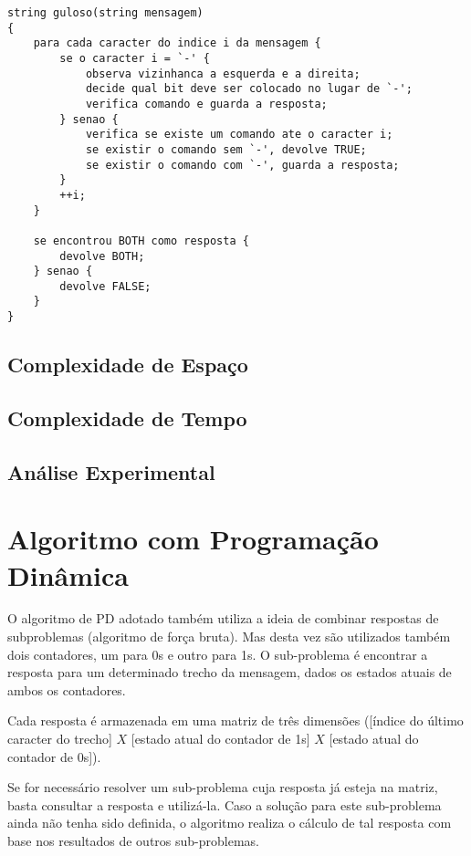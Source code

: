 \documentclass[a4paper,12pt,titlepage]{article}
\begin{document}
\begin{lstlisting}[caption=Algoritmo Guloso]
string guloso(string mensagem)
{
    para cada caracter do indice i da mensagem {
        se o caracter i = `-' {
            observa vizinhanca a esquerda e a direita;
            decide qual bit deve ser colocado no lugar de `-';
            verifica comando e guarda a resposta;
        } senao {
            verifica se existe um comando ate o caracter i;
            se existir o comando sem `-', devolve TRUE;
            se existir o comando com `-', guarda a resposta;
        }
        ++i;
    }
    
    se encontrou BOTH como resposta {
        devolve BOTH;
    } senao {
        devolve FALSE;
    }
}
\end{lstlisting}

\subsection{Complexidade de Espaço}
\subsection{Complexidade de Tempo}
\subsection{Análise Experimental}


\section{Algoritmo com Programação Dinâmica}
O algoritmo de PD adotado também utiliza a ideia de combinar respostas de subproblemas (algoritmo de força bruta). Mas desta vez são utilizados também dois contadores, um para 0s e outro para 1s. O sub-problema é encontrar a resposta para um determinado trecho da mensagem, dados os estados atuais de ambos os contadores. 

Cada resposta é armazenada em uma matriz de três dimensões ([índice do último caracter do trecho] $X$ [estado atual do contador de 1s] $X$ [estado atual do contador de 0s]).

Se for necessário resolver um sub-problema cuja resposta já esteja na matriz, basta consultar a resposta e utilizá-la. Caso a solução para este sub-problema ainda não tenha sido definida, o algoritmo realiza o cálculo de tal resposta com base nos resultados de outros sub-problemas. \ \\
\end{document}
